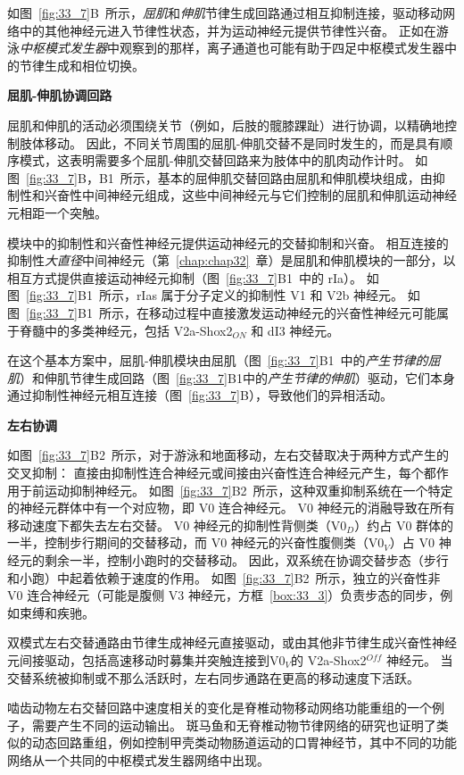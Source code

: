如图~\ref{fig:33_7}B~所示，\textit{屈肌}和\textit{伸肌}节律生成回路通过相互抑制连接，驱动移动网络中的其他神经元进入节律性状态，并为运动神经元提供节律性兴奋。
正如在游泳\textit{中枢模式发生器}中观察到的那样，离子通道也可能有助于四足中枢模式发生器中的节律生成和相位切换。


\textbf{屈肌-伸肌协调回路}

屈肌和伸肌的活动必须围绕关节（例如，后肢的髋膝踝趾）进行协调，以精确地控制肢体移动。
因此，不同关节周围的屈肌-伸肌交替不是同时发生的，而是具有顺序模式，这表明需要多个屈肌-伸肌交替回路来为肢体中的肌肉动作计时。
如图~\ref{fig:33_7}B，B1~所示，基本的屈伸肌交替回路由屈肌和伸肌模块组成，由抑制性和兴奋性中间神经元组成，这些中间神经元与它们控制的屈肌和伸肌运动神经元相距一个突触。


模块中的抑制性和兴奋性神经元提供运动神经元的交替抑制和兴奋。
相互连接的抑制性\textit{大直径}中间神经元（第~\ref{chap:chap32}~章）是屈肌和伸肌模块的一部分，以相互方式提供直接运动神经元抑制（图~\ref{fig:33_7}B1~中的 rIa）。
如图~\ref{fig:33_7}B1~所示，rIas 属于分子定义的抑制性 V1 和 V2b 神经元。
如图~\ref{fig:33_7}B1~所示，在移动过程中直接激发运动神经元的兴奋性神经元可能属于脊髓中的多类神经元，包括 V2a-Shox2$_{ON}$ 和 dI3 神经元。


在这个基本方案中，屈肌-伸肌模块由屈肌（图~\ref{fig:33_7}B1~中的\textit{产生节律的屈肌}）和伸肌节律生成回路（图~\ref{fig:33_7}B1中的\textit{产生节律的伸肌}）驱动，它们本身通过抑制性神经元相互连接（图~\ref{fig:33_7}B），导致他们的异相活动。


\textbf{左右协调}

如图~\ref{fig:33_7}B2~所示，对于游泳和地面移动，左右交替取决于两种方式产生的交叉抑制：
直接由抑制性连合神经元或间接由兴奋性连合神经元产生，每个都作用于前运动抑制神经元。
如图~\ref{fig:33_7}B2~所示，这种双重抑制系统在一个特定的神经元群体中有一个对应物，即 V0 连合神经元。
V0 神经元的消融导致在所有移动速度下都失去左右交替。
V0 神经元的抑制性背侧类（V0$_D$）约占 V0 群体的一半，控制步行期间的交替移动，而 V0 神经元的兴奋性腹侧类（V0$_V$）占 V0 神经元的剩余一半，控制小跑时的交替移动。
因此，双系统在协调交替步态（步行和小跑）中起着依赖于速度的作用。
如图~\ref{fig:33_7}B2~所示，独立的兴奋性非 V0 连合神经元（可能是腹侧 V3 神经元，方框~\ref{box:33_3}）负责步态的同步，例如束缚和疾驰。


双模式左右交替通路由节律生成神经元直接驱动，或由其他非节律生成兴奋性神经元间接驱动，包括高速移动时募集并突触连接到V0$_V$的 V2a-Shox2$^{Off}$ 神经元。
当交替系统被抑制或不那么活跃时，左右同步通路在更高的移动速度下活跃。


啮齿动物左右交替回路中速度相关的变化是脊椎动物移动网络功能重组的一个例子，需要产生不同的运动输出。
斑马鱼和无脊椎动物节律网络的研究也证明了类似的动态回路重组，例如控制甲壳类动物肠道运动的口胃神经节，其中不同的功能网络从一个共同的中枢模式发生器网络中出现。



